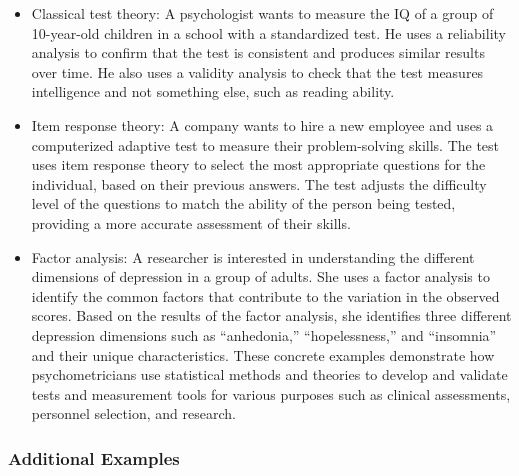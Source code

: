 \documentclass[
]{article}
\providecommand{\tightlist}{%
  \setlength{\itemsep}{0pt}\setlength{\parskip}{0pt}}
\begin{document}
\begin{itemize}
\tightlist
\item
  Classical test theory: A psychologist wants to measure the IQ of a
  group of 10-year-old children in a school with a standardized test. He
  uses a reliability analysis to confirm that the test is consistent and
  produces similar results over time. He also uses a validity analysis
  to check that the test measures intelligence and not something else,
  such as reading ability.
\item
  Item response theory: A company wants to hire a new employee and uses
  a computerized adaptive test to measure their problem-solving skills.
  The test uses item response theory to select the most appropriate
  questions for the individual, based on their previous answers. The
  test adjusts the difficulty level of the questions to match the
  ability of the person being tested, providing a more accurate
  assessment of their skills.
\item
  Factor analysis: A researcher is interested in understanding the
  different dimensions of depression in a group of adults. She uses a
  factor analysis to identify the common factors that contribute to the
  variation in the observed scores. Based on the results of the factor
  analysis, she identifies three different depression dimensions such as
  “anhedonia,” “hopelessness,” and “insomnia” and their unique
  characteristics. These concrete examples demonstrate how
  psychometricians use statistical methods and theories to develop and
  validate tests and measurement tools for various purposes such as
  clinical assessments, personnel selection, and research.
\end{itemize}

\hypertarget{additional-examples}{%
\subsubsection{Additional Examples}\label{additional-examples}}
\end{document}
